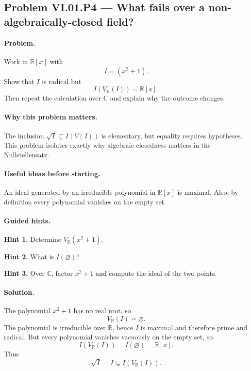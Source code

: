 \subsection*{Problem VI.01.P4 --- What fails over a non-algebraically-closed field?}
\label{prob:vi01-p4}

\paragraph{Problem.}
Work in \(\mathbb R[x]\) with
\[
I=(x^2+1).
\]
Show that \(I\) is radical but
\[
I(V_{\mathbb R}(I))=\mathbb R[x].
\]
Then repeat the calculation over \(\mathbb C\) and explain why the outcome changes.

\ifdefined\FullProblemDossiers
\paragraph{Why this problem matters.}
The inclusion \(\sqrt I\subseteq I(V(I))\) is elementary, but equality requires hypotheses.
This problem isolates exactly why algebraic closedness matters in the Nullstellensatz.

\paragraph{Useful ideas before starting.}
An ideal generated by an irreducible polynomial in \(\mathbb R[x]\) is maximal.  Also,
by definition every polynomial vanishes on the empty set.

\paragraph{Guided hints.}
\textbf{Hint 1.} Determine \(V_{\mathbb R}(x^2+1)\).

\textbf{Hint 2.} What is \(I(\varnothing)\)?

\textbf{Hint 3.} Over \(\mathbb C\), factor \(x^2+1\) and compute the ideal of the two
points.

\paragraph{Solution.}
The polynomial \(x^2+1\) has no real root, so
\[
V_{\mathbb R}(I)=\varnothing.
\]
The polynomial is irreducible over \(\mathbb R\), hence \(I\) is maximal and therefore
prime and radical.  But every polynomial vanishes vacuously on the empty set, so
\[
I(V_{\mathbb R}(I))=I(\varnothing)=\mathbb R[x].
\]
Thus
\[
\sqrt I=I\subsetneq I(V_{\mathbb R}(I)).
\]


